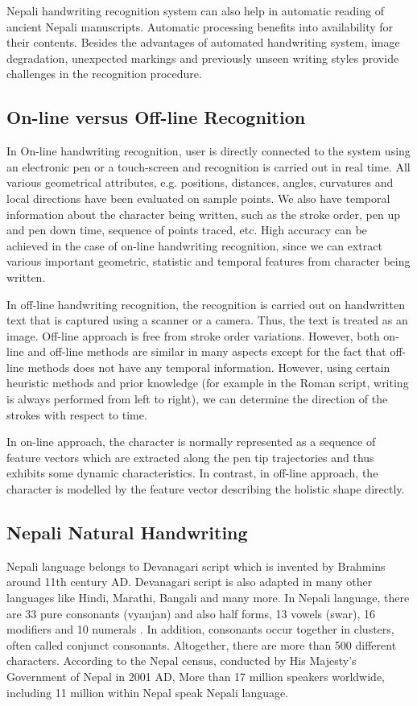 Nepali handwriting recognition system can also help in automatic reading of ancient Nepali manuscripts. Automatic processing benefits into availability for their contents. Besides the advantages of automated handwriting system, image degradation, unexpected markings and previously unseen writing styles provide challenges in the recognition procedure.

\subsection{On-line versus Off-line Recognition}\label{section_online_offline}

In On-line handwriting recognition, user is directly connected to the system using an electronic pen or a touch-screen and recognition is carried out in real time. All various geometrical attributes, e.g. positions, distances, angles, curvatures and local directions have been evaluated on sample points. We also have temporal information about the character being written, such as the stroke order, pen up and pen down time, sequence of points traced, etc. High accuracy can be achieved in the case of on-line handwriting recognition, since we can extract various important geometric, statistic and temporal features from character being written.

In off-line handwriting recognition, the recognition is carried out on handwritten text that is captured using a scanner or a camera. Thus, the text is treated as an image. Off-line approach is free from stroke order variations. However, both on-line and off-line methods are similar in many aspects except for the fact that off-line methods does not have any temporal information. However, using certain heuristic methods and prior knowledge (for example in the Roman script, writing is always performed from left to right), we can determine the direction of the strokes with respect to time.

In on-line approach, the character is normally represented as a sequence of feature vectors which are extracted along the pen tip trajectories and thus exhibits some dynamic characteristics. In contrast, in off-line approach, the character is modelled by the feature vector describing the holistic shape directly.

\subsection{Nepali Natural Handwriting}
Nepali language belongs to Devanagari script which is invented by Brahmins around 11th century AD. Devanagari script is also adapted in many other languages like Hindi, Marathi, Bangali and many more. In Nepali language, there are 33 pure consonants (vyanjan) and also half forms, 13 vowels (swar), 16 modifiers and 10 numerals \cite{Santosh2007}. In addition, consonants occur together in clusters, often called conjunct consonants. Altogether, there are more than 500 different characters. According to the Nepal census, conducted by His Majesty's Government of Nepal in 2001 AD, More than 17 million speakers worldwide, including 11 million within Nepal speak Nepali language.

